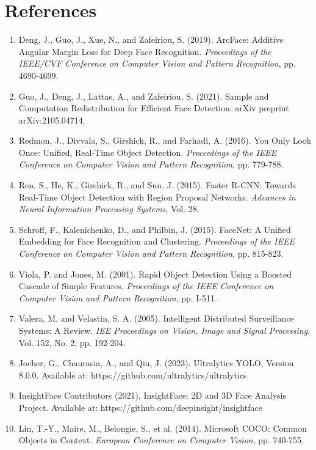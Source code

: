 \documentclass[12pt,a4paper]{report}
\begin{document}
\chapter*{References}

\begin{enumerate}
    \item Deng, J., Guo, J., Xue, N., and Zafeiriou, S. (2019). ArcFace: Additive Angular Margin Loss for Deep Face Recognition. \textit{Proceedings of the IEEE/CVF Conference on Computer Vision and Pattern Recognition}, pp. 4690-4699.

    \item Guo, J., Deng, J., Lattas, A., and Zafeiriou, S. (2021). Sample and Computation Redistribution for Efficient Face Detection. arXiv preprint arXiv:2105.04714.

    \item Redmon, J., Divvala, S., Girshick, R., and Farhadi, A. (2016). You Only Look Once: Unified, Real-Time Object Detection. \textit{Proceedings of the IEEE Conference on Computer Vision and Pattern Recognition}, pp. 779-788.

    \item Ren, S., He, K., Girshick, R., and Sun, J. (2015). Faster R-CNN: Towards Real-Time Object Detection with Region Proposal Networks. \textit{Advances in Neural Information Processing Systems}, Vol. 28.

    \item Schroff, F., Kalenichenko, D., and Philbin, J. (2015). FaceNet: A Unified Embedding for Face Recognition and Clustering. \textit{Proceedings of the IEEE Conference on Computer Vision and Pattern Recognition}, pp. 815-823.

    \item Viola, P. and Jones, M. (2001). Rapid Object Detection Using a Boosted Cascade of Simple Features. \textit{Proceedings of the IEEE Conference on Computer Vision and Pattern Recognition}, pp. I-511.

    \item Valera, M. and Velastin, S. A. (2005). Intelligent Distributed Surveillance Systems: A Review. \textit{IEE Proceedings on Vision, Image and Signal Processing}, Vol. 152, No. 2, pp. 192-204.

    \item Jocher, G., Chaurasia, A., and Qiu, J. (2023). Ultralytics YOLO, Version 8.0.0. Available at: https://github.com/ultralytics/ultralytics

    \item InsightFace Contributors (2021). InsightFace: 2D and 3D Face Analysis Project. Available at: https://github.com/deepinsight/insightface

    \item Lin, T.-Y., Maire, M., Belongie, S., et al. (2014). Microsoft COCO: Common Objects in Context. \textit{European Conference on Computer Vision}, pp. 740-755.
\end{enumerate}
\end{document}
